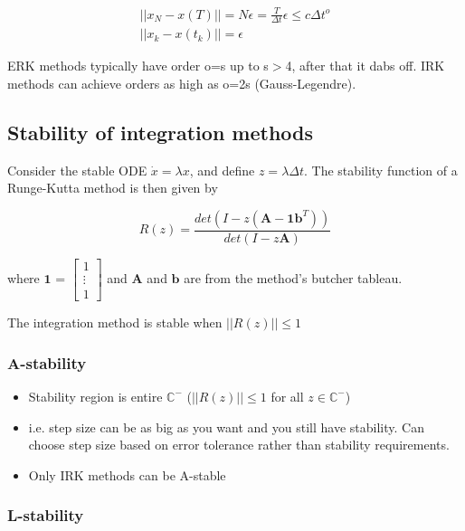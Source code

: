 \begin{equation}
\begin{aligned}
    ||x_N - x(T)|| = N\epsilon = \frac{T}{\Delta t}\epsilon \leq c\Delta t^o\\
    ||x_k-x(t_k)|| = \epsilon
\end{aligned}
\end{equation}

ERK methods typically have order o=s up to s$>$4, after that it dabs off. IRK methods can achieve orders as high as o=2s (Gauss-Legendre). 

\subsection{Stability of integration methods}
Consider the stable ODE $\dot{x} = \lambda x$, and define $z = \lambda \Delta t$.
The stability function of a Runge-Kutta method is then given by

\begin{equation}
    R(z) = \frac{det(I-z(\boldsymbol{A}-\boldsymbol{1}\boldsymbol{b}^T))}{det(I-z\boldsymbol{A})}
\end{equation}

where $\boldsymbol{1}$ = $\begin{bmatrix} 1\\\vdots\\1\end{bmatrix}$ and $\boldsymbol{A}$ and $\boldsymbol{b}$ are from the method's butcher tableau. 

The integration method is stable when $||R(z)|| \leq 1$


\subsubsection{A-stability}
\begin{itemize}
    \item Stability region is entire $\mathbb{C}^{-}$ ($||R(z)||\le 1$ for all $z\in\mathbb C^-$)
    \item i.e. step size can be as big as you want and you still have stability. Can choose step size based on error tolerance rather than stability requirements. 
    \item Only IRK methods can be A-stable
\end{itemize}

\subsubsection{L-stability}

